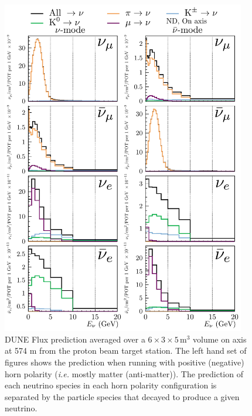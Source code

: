 \documentclass{article}
\begin{document}
\begin{figure}
  \centering
  \includegraphics[width=0.95\textwidth]{plots/fluxpredcompvar/ND_HadronParentFluxComponents_0m_offaxis}
  \caption{DUNE Flux prediction averaged over a $6\times 3\times 5\,\textrm{m}^{3}$ volume on axis at 574 m from the proton beam target station. The left hand set of figures shows the prediction when running with positive (negative) horn polarity (\textit{i.e.} mostly matter (anti-matter)). The prediction of each neutrino species in each horn polarity configuration is separated by the particle species that decayed to produce a given neutrino.}
  \label{fig:flux_predictions__on_axis}
\end{figure}
\end{document}
